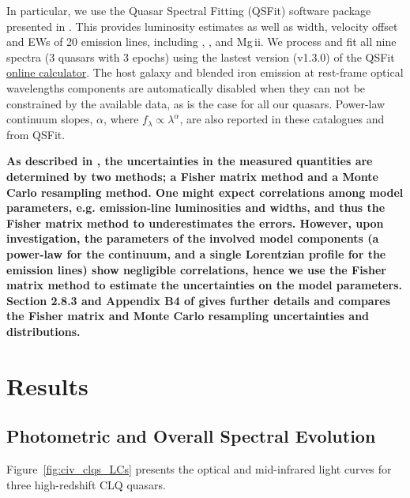 \documentclass[fleqn,usenatbib]{mnras}
\begin{document}
In particular, we use the Quasar Spectral Fitting (QSFit) software
package presented in \citet{Calderone2017}. This provides luminosity
estimates as well as width, velocity offset and EWs of 20 emission
lines, including \civ, \ciii, and {Mg\,{\sc ii}}. We process and fit
all nine spectra (3 quasars with 3 epochs) using the lastest version
(v1.3.0) of the QSFit
\href{https://qsfit.inaf.it/cat_1.30/onlinefit.php}{online
calculator}. The host galaxy and blended iron emission at rest-frame
optical wavelengths components are automatically disabled when they
can not be constrained by the available data, as is the case for all
our quasars.  Power-law continuum slopes, $\alpha$, where $f_{\lambda}
\propto \lambda^{\alpha}$, are also reported in these catalogues and
from QSFit.

{\bf As described in \citet{Calderone2017}, the uncertainties in the
measured quantities are determined by two methods; a Fisher matrix
method and a Monte Carlo resampling method.  One might expect
correlations among model parameters, e.g. emission-line luminosities
and widths, and thus the Fisher matrix method to underestimates the
errors.  However, upon investigation, the parameters of the involved
model components (a power-law for the continuum, and a single
Lorentzian profile for the emission lines) show negligible
correlations, hence we use the Fisher matrix method to estimate the
uncertainties on the model parameters.  Section 2.8.3 and Appendix B4
of \citet{Calderone2017} gives further details and compares the Fisher
matrix and Monte Carlo resampling uncertainties and distributions.}
  



\section{Results}
\subsection{Photometric and Overall Spectral Evolution}
Figure~\ref{fig:civ_clqs_LCs} presents the optical and mid-infrared light
curves for three high-redshift CLQ quasars.
\end{document}
